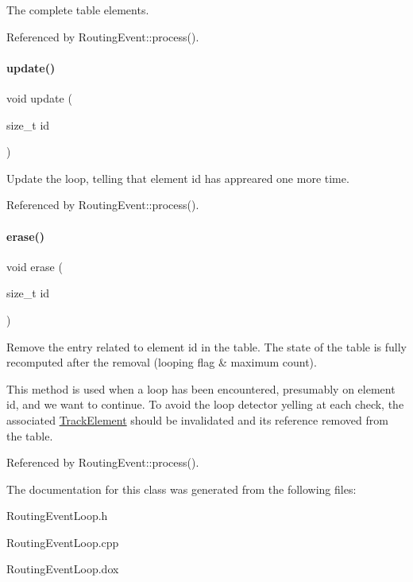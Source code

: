The complete table elements. 

Referenced by Routing\+Event\+::process().

\mbox{\label{classKite_1_1RoutingEventLoop_ad684b7c05480897bdbd86a5fb8363c72}} 
\paragraph{\texorpdfstring{update()}{update()}}
{\footnotesize\ttfamily void update (\begin{DoxyParamCaption}\item[{size\+\_\+t}]{id }\end{DoxyParamCaption})}

Update the loop, telling that element {\ttfamily id} has appreared one more time. 

Referenced by Routing\+Event\+::process().

\mbox{\label{classKite_1_1RoutingEventLoop_a9b6582ce996327c65bf532396ca11b61}} 
\paragraph{\texorpdfstring{erase()}{erase()}}
{\footnotesize\ttfamily void erase (\begin{DoxyParamCaption}\item[{size\+\_\+t}]{id }\end{DoxyParamCaption})}

Remove the entry related to element {\ttfamily id} in the table. The state of the table is fully recomputed after the removal (looping flag \& maximum count).

This method is used when a loop has been encountered, presumably on element {\ttfamily id}, and we want to continue. To avoid the loop detector yelling at each check, the associated \mbox{\hyperlink{classKite_1_1TrackElement}{Track\+Element}} should be invalidated and it\textquotesingle{}s reference removed from the table. 

Referenced by Routing\+Event\+::process().



The documentation for this class was generated from the following files\+:\begin{DoxyCompactItemize}
\item 
Routing\+Event\+Loop.\+h\item 
Routing\+Event\+Loop.\+cpp\item 
Routing\+Event\+Loop.\+dox\end{DoxyCompactItemize}
